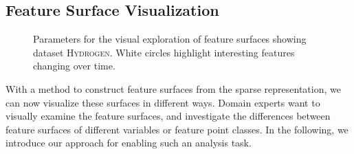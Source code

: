 %
%
\subsection{Feature Surface Visualization}
%
\begin{figure}[p]
    \centering
    \setlength\figurewidth\textwidth
    
    \caption{Parameters for the visual exploration of feature surfaces showing
    	dataset \textsc{Hydrogen}. White circles highlight interesting features
    	changing over time.
    }
    \label{fig_contourmeshvis}
\end{figure}
%
With a method to construct feature surfaces from the sparse representation, we
can now visualize these surfaces in different ways.
%
Domain experts want to visually examine the feature surfaces, and investigate
the differences between feature surfaces of different variables or feature point
classes.
%
In the following, we introduce our approach for enabling such an analysis task.
%
%
